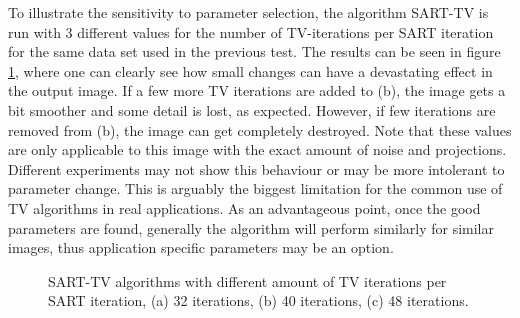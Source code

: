 \begin{table}
\begin{center}
\caption{NRMSE for the reconstructed images in figure \ref{fig:TVXCAT}}
\label{tab:NRMSE TVs}
\end{center}
\end{table}






To illustrate the sensitivity to parameter selection, the algorithm SART-TV is run with 3 different values for the number of TV-iterations per SART iteration for the same data set used in the previous test. The results can be seen in figure \ref{fig:SARTTVparams}, where one can clearly see how small changes can have a devastating effect in the output image.   If a few more TV iterations are added to (b), the image gets a bit smoother and some detail is lost, as expected. However, if few iterations are removed from (b), the image can get completely destroyed. Note that these values are only applicable to this image with the exact amount of noise and projections. Different experiments may not show this behaviour or may be more intolerant to parameter change. This is arguably the biggest limitation for the common use of TV algorithms in real applications. As an advantageous point, once the good parameters are found, generally the algorithm will perform similarly for similar images, thus application specific parameters may be an option.






\begin{figure}
\centering
{}
\caption[SART-TV algorithms with different parameters]{\label{fig:SARTTVparams}SART-TV algorithms with different amount of TV iterations per SART iteration, (a) 32 iterations, (b) 40 iterations, (c) 48 iterations.}
\end{figure}



